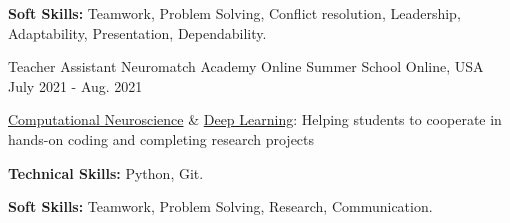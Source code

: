 \begin{cventries}
{\begin{cvitems}
        \item {\textbf{Soft Skills:} Teamwork, Problem Solving, Conflict resolution, Leadership, Adaptability, Presentation, Dependability.}
      \end{cvitems}
    }
  \cventry
    {Teacher Assistant}
    {Neuromatch Academy Online Summer School}
    {Online, USA}
    {July 2021 -  Aug. 2021}
    {
      \begin{cvitems} %
        \item{\href{https://github.com/NeuromatchAcademy/course-content-dl}{Computational Neuroscience} \& \href{https://github.com/NeuromatchAcademy/course-content-dl}{Deep Learning}: Helping students to cooperate in hands-on coding and completing research projects}
        \item {\textbf{Technical Skills:} Python, Git.}
        \item {\textbf{Soft Skills:} Teamwork, Problem Solving, Research, Communication.}
      \end{cvitems}
    }
 

\end{cventries}
